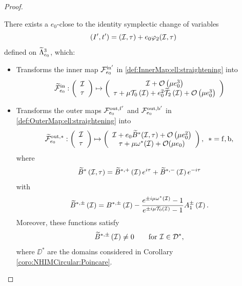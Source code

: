 \begin{proof}
  \begin{lemma}\label{lemma:Averaging}
    There exists a $e_0$-close to the identity symplectic change of variables
    \begin{equation}\label{def:AveragingChange}
      \left(I',t'\right)=(\mathcal{I},\tau)+e_0\varphi_2 (\mathcal{I},\tau)
    \end{equation}
    defined on $\widetilde \Lambda^3_{e_0}$, which:
\begin{itemize}
\item Transforms the inner map $\mathcal{F}_{e_0}^{\mathrm{in}'}$ in \eqref{def:InnerMap:ell:straightening} into
    \begin{equation}\label{def:InnerMap:ell:modified}
      \widetilde{\mathcal{F}}_{e_0}^{\mathrm{in}}:\left(\begin{array}{c} \mathcal{I}\\
          \tau
        \end{array}\right)\mapsto \left(\begin{array}{c}  \mathcal{I}+\mathcal{O}\left(\mu e_0^3\right)\\
          \tau+\mu\mathcal{T}_0\left(\mathcal{I}\right)+e_0^2 \widetilde {\mathcal{T}}_2\left(\mathcal{I}\right)+\mathcal{O}\left(\mu e_0^3\right)
        \end{array}\right)
    \end{equation}
\item Transforms the outer maps $\mathcal{F}_{e_0}^{\mathrm{out},\mathrm{f}'}$ and $\mathcal{F}_{e_0}^{\mathrm{out},\mathrm{b}'}$ in \eqref{def:OuterMap:ell:straightening} into
    \begin{equation}\label{def:OuterMap:ell:modified}
      \widetilde{\mathcal{F}}_{e_0}^{\mathrm{out},\ast}:\left(\begin{array}{c} \mathcal{I}\\
          \tau
        \end{array}\right)\mapsto \left(\begin{array}{c}  \mathcal{I}+e_0 \widetilde B^\ast (\mathcal{I}, \tau)+\mathcal{O}\left(\mu e_0^2\right)\\
          \tau+\mu\omega^\ast(\mathcal{I})+\mathcal{O}(\mu e_0)
        \end{array}\right),\,\,\,\ast=\mathrm{f},\mathrm{b},
    \end{equation}
    where
    \[
    \widetilde B^\ast \left(\mathcal{I}, \tau\right)=\widetilde B^{\ast,+} \left(\mathcal{I}\right) e^{i\tau}+\widetilde B^{\ast,-} \left(\mathcal{I}\right) e^{-i\tau}
    \]
    with
    \[
    \widetilde B^{\ast,\pm} \left(\mathcal{I}\right)=B^{\ast,\pm} \left(\mathcal{I}\right)-\frac{e^{\pm i\mu\omega^\ast(\mathcal{I})}-1}{e^{\pm i\mu\mathcal{T}_0(\mathcal{I})}-1}A_1^\pm \left(\mathcal{I}\right).
    \]
    Moreover, these functions satisfy
    \begin{equation}\label{eq:NonVanishing:Outer}
      \widetilde B^{\ast,\pm} \left(\mathcal{I}\right)\neq 0\qquad\text{for }\mathcal{I}\in \mathcal{D}^\ast,
    \end{equation}
where $\DD^\ast$ are the domains considered in Corollary \ref{coro:NHIMCircular:Poincare}.
\end{itemize}
  \end{lemma}


\end{proof}
